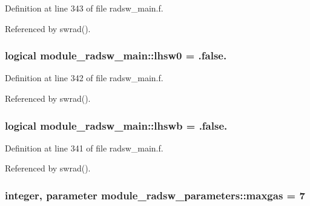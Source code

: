 Definition at line 343 of file radsw\+\_\+main.\+f.



Referenced by swrad().

\subsubsection[{\texorpdfstring{lhsw0}{lhsw0}}]{\setlength{\rightskip}{0pt plus 5cm}logical module\+\_\+radsw\+\_\+main\+::lhsw0 = .false.\hspace{0.3cm}{\ttfamily [private]}}\hypertarget{group__module__radsw__main_ga3fd8cae0d38772eea36ce6ec2d258997}{}\label{group__module__radsw__main_ga3fd8cae0d38772eea36ce6ec2d258997}


Definition at line 342 of file radsw\+\_\+main.\+f.



Referenced by swrad().

\subsubsection[{\texorpdfstring{lhswb}{lhswb}}]{\setlength{\rightskip}{0pt plus 5cm}logical module\+\_\+radsw\+\_\+main\+::lhswb = .false.\hspace{0.3cm}{\ttfamily [private]}}\hypertarget{group__module__radsw__main_ga08bfecbd5edb2ad3ba0ae836cfe18d05}{}\label{group__module__radsw__main_ga08bfecbd5edb2ad3ba0ae836cfe18d05}


Definition at line 341 of file radsw\+\_\+main.\+f.



Referenced by swrad().

\subsubsection[{\texorpdfstring{maxgas}{maxgas}}]{\setlength{\rightskip}{0pt plus 5cm}integer, parameter module\+\_\+radsw\+\_\+parameters\+::maxgas = 7}\hypertarget{group__module__radsw__main_ga5bc6fbb4231281a604352eec6b8e2bfc}{}\label{group__module__radsw__main_ga5bc6fbb4231281a604352eec6b8e2bfc}


